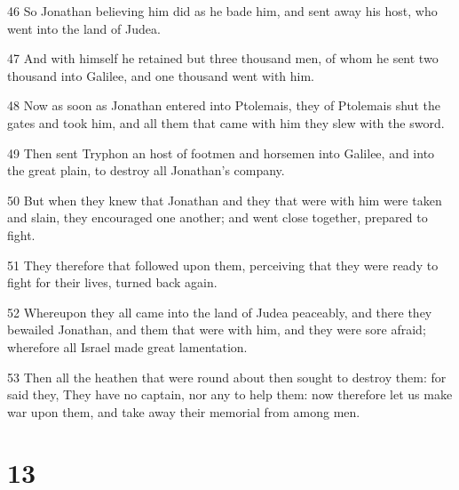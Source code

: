 \par 46 So Jonathan believing him did as he bade him, and sent away his host, who went into the land of Judea.
\par 47 And with himself he retained but three thousand men, of whom he sent two thousand into Galilee, and one thousand went with him.
\par 48 Now as soon as Jonathan entered into Ptolemais, they of Ptolemais shut the gates and took him, and all them that came with him they slew with the sword.
\par 49 Then sent Tryphon an host of footmen and horsemen into Galilee, and into the great plain, to destroy all Jonathan's company.
\par 50 But when they knew that Jonathan and they that were with him were taken and slain, they encouraged one another; and went close together, prepared to fight.
\par 51 They therefore that followed upon them, perceiving that they were ready to fight for their lives, turned back again.
\par 52 Whereupon they all came into the land of Judea peaceably, and there they bewailed Jonathan, and them that were with him, and they were sore afraid; wherefore all Israel made great lamentation.
\par 53 Then all the heathen that were round about then sought to destroy them: for said they, They have no captain, nor any to help them: now therefore let us make war upon them, and take away their memorial from among men.

\chapter{13}

